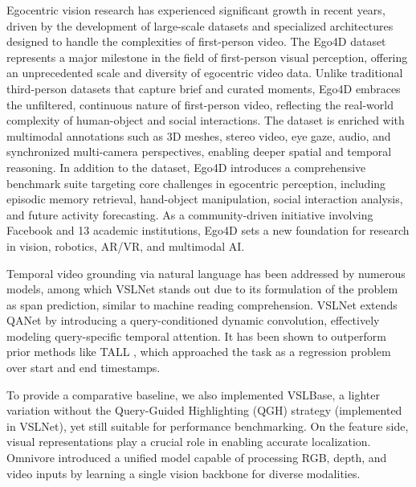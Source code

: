 \documentclass[10pt,twocolumn,letterpaper]{article}
\begin{document}
Egocentric vision research has experienced significant growth in recent years, driven by the development of large-scale datasets and specialized architectures designed to handle the complexities of first-person video. The Ego4D dataset represents a major milestone in the field of first-person visual perception, offering an unprecedented scale and diversity of egocentric video data. Unlike traditional third-person datasets that capture brief and curated moments, Ego4D embraces the unfiltered, continuous nature of first-person video, reflecting the real-world complexity of human-object and social interactions. The dataset is enriched with multimodal annotations such as 3D meshes, stereo video, eye gaze, audio, and synchronized multi-camera perspectives, enabling deeper spatial and temporal reasoning. In addition to the dataset, Ego4D introduces a comprehensive benchmark suite targeting core challenges in egocentric perception, including episodic memory retrieval, hand-object manipulation, social interaction analysis, and future activity forecasting. As a community-driven initiative involving Facebook and 13 academic institutions, Ego4D sets a new foundation for research in vision, robotics, AR/VR, and multimodal AI\cite{1_Ego4D_Around_the_World_in_3000_Hours_of_Egocentric_Video}.
	
	
Temporal video grounding via natural language has been addressed by numerous models, among which VSLNet stands out due to its formulation of the problem as span prediction, similar to machine reading comprehension\cite{4_Span_based_Localizing_Network_for_Natural_Language_Video_Localization}. VSLNet extends QANet by introducing a query-conditioned dynamic convolution, effectively modeling query-specific temporal attention. It has been shown to outperform prior methods like TALL \cite{3_TALL_Temporal_Activity_Localization_via_Language_Query}, which approached the task as a regression problem over start and end timestamps.
	
To provide a comparative baseline, we also implemented VSLBase, a lighter variation without the Query-Guided Highlighting (QGH) strategy (implemented in VSLNet), yet still suitable for performance benchmarking.
On the feature side, visual representations play a crucial role in enabling accurate localization. Omnivore \cite{8_OMNIVORE_ASingle_Model_for_Many_Visual_Modalities} introduced a unified model capable of processing RGB, depth, and video inputs by learning a single vision backbone for diverse modalities.
	
\end{document}
